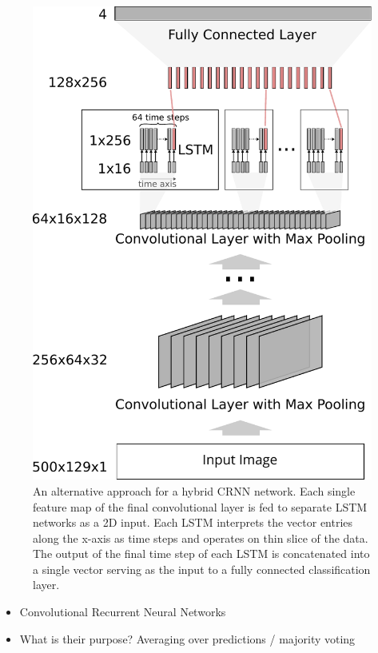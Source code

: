 	\begin{figure}[]
  		\centering
    	\includegraphics[width=\textwidth, keepaspectratio]{img/crnn2.pdf}
    	\caption{An alternative approach for a hybrid CRNN network. Each single feature map of the final convolutional layer is fed to separate LSTM networks as a 2D input. Each LSTM interprets the vector entries along the x-axis as time steps and operates on thin slice of the data. The output of the final time step of each LSTM is concatenated into a single vector serving as the input to a fully connected classification layer.}
    	\label{fig:crnn}
	\end{figure}

    \begin{itemize}
        \item Convolutional Recurrent Neural Networks
        \item What is their purpose? Averaging over predictions / majority voting
    \end{itemize}


